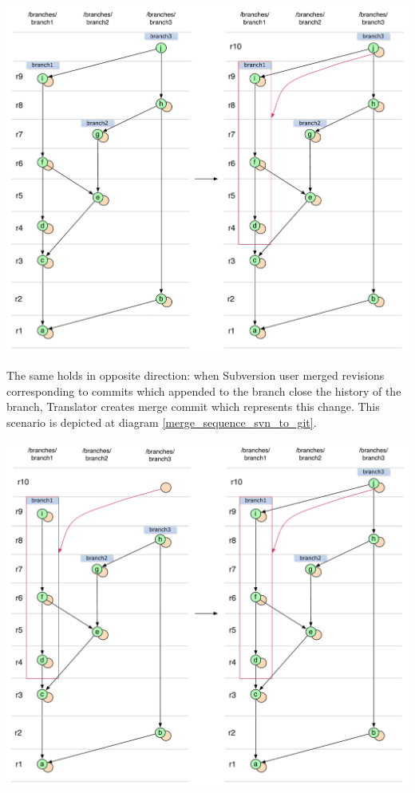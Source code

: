 \begin{center}
\includegraphics[width=\textwidth]{img/diagrams/merge_sequence_git_to_svn.pdf}%
\label{merge_sequence_git_to_svn}%
\end{center}

The same holds in opposite direction: when Subversion user merged revisions corresponding to commits which appended to the branch close the history of the branch, Translator creates merge commit which represents this change. This scenario is depicted at diagram \ref{merge_sequence_svn_to_git}.

\begin{center}
\includegraphics[width=\textwidth]{img/diagrams/merge_sequence_svn_to_git.pdf}%
\label{merge_sequence_svn_to_git}%
\end{center}


